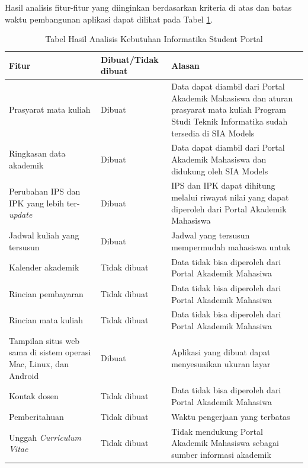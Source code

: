 Hasil analisis fitur-fitur yang diinginkan berdasarkan kriteria di atas dan batas waktu pembangunan aplikasi dapat dilihat pada Tabel \ref{tab:3_hasil_fitur}.
\begin{table}[H]
	\centering
		\caption{Tabel Hasil Analisis Kebutuhan Informatika Student Portal}
    \begin{tabular}{|p{4.5cm}|p{2.5cm}|p{8cm}|}
		\hline
		Fitur & Dibuat/Tidak dibuat & Alasan\\
		\hline
		Prasyarat mata kuliah                             & Dibuat       & Data dapat diambil dari Portal Akademik Mahasiswa dan aturan prasyarat mata kuliah Program Studi Teknik Informatika sudah tersedia di SIA Models                   \\
		\hline
    Ringkasan data akademik                               & Dibuat       & Data dapat diambil dari Portal Akademik Mahasiswa dan didukung oleh SIA Models                        \\
		\hline
    Perubahan IPS dan IPK yang lebih ter-\textit{update}   & Dibuat       &  IPS dan IPK dapat dihitung melalui riwayat nilai yang dapat diperoleh dari Portal Akademik Mahasiswa \\
		\hline
    Jadwal kuliah yang tersusun                       & Dibuat       & Jadwal yang tersusun mempermudah mahasiswa untuk                                                      \\
		\hline
    Kalender akademik                                 & Tidak dibuat & Data tidak bisa diperoleh dari Portal Akademik Mahasiwa                                               \\
		\hline
    Rincian pembayaran                                & Tidak dibuat & Data tidak bisa diperoleh dari Portal Akademik Mahasiwa                                               \\
		\hline
    Rincian mata kuliah                               & Tidak dibuat & Data tidak bisa diperoleh dari Portal Akademik Mahasiwa                                               \\
		\hline
    Tampilan situs web sama di sistem operasi Mac, Linux, dan Android & Dibuat       & Aplikasi yang dibuat dapat menyesuaikan ukuran layar                                           \\
		\hline
    Kontak dosen                                      & Tidak dibuat & Data tidak bisa diperoleh dari Portal Akademik Mahasiwa                                               \\
		\hline
    Pemberitahuan                                     & Tidak dibuat & Waktu pengerjaan yang terbatas                                                                        \\
		\hline
    Unggah \textit{Curriculum Vitae}                           & Tidak dibuat & Tidak mendukung Portal Akademik Mahasiswa sebagai sumber informasi akademik                           \\
		\hline
		\end{tabular}
	\label{tab:3_hasil_fitur}
\end{table}


